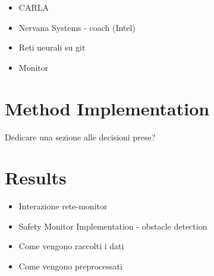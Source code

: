 \begin{itemize}
	\item CARLA
	\item Nervana Systems - coach (Intel)
	\item Reti neurali su git
	\item Monitor
\end{itemize}


\section{Method Implementation}

Dedicare una sezione alle decisioni prese?

\section{Results}

\begin{itemize}
	
	\item Interazione rete-monitor
	\item Safety Monitor Implementation - obstacle detection
	\item Come vengono raccolti i dati
	\item Come vengono preprocessati
	
\end{itemize}

